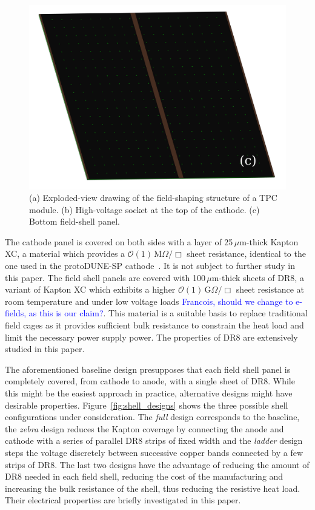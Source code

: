\documentclass[a4paper,12pt]{article}
\newcommand{\DR}{DR8}
\newcommand{\RI}[1]{\textcolor{blue}{#1}}
\begin{document}
\begin{figure}[htbp]
\begin{minipage}[b]{.4\textwidth}
	\includegraphics[width=\linewidth]{field_shell_bottom.PNG}
\end{minipage}
\caption{(a) Exploded-view drawing of the field-shaping structure of a TPC module. (b) High-voltage socket at the top of the cathode. (c) Bottom field-shell panel.}
\label{fig:field_shell}
\end{figure}

The cathode panel is covered on both sides with a layer of 25\,$\mu$m-thick Kapton XC, a material which provides a $\mathcal{O}(1)\,$M$\Omega/\Box$ sheet resistance, identical to the one used in the protoDUNE-SP cathode~\cite{protodune_sp_tdr}. It is not subject to further study in this paper. The field shell panels are covered with 100\,$\mu$m-thick sheets of {\DR}, a variant of Kapton XC which exhibits a higher $\mathcal{O}(1)\,$G$\Omega/\Box$ sheet resistance at room temperature and under low voltage loads \RI{ Francois, should we change to e-fields, as this is our claim?}. This material is a suitable basis to replace traditional field cages as it provides sufficient bulk resistance to constrain the heat load and limit the necessary power supply power. The properties of {\DR} are extensively studied in this paper.%

The aforementioned baseline design presupposes that each field shell panel is completely covered, from cathode to anode, with a single sheet of {\DR}. While this might be the easiest approach in practice, alternative designs might have desirable properties. Figure~\ref{fig:shell_designs} shows the three possible shell configurations under consideration. The \textit{full} design corresponds to the baseline, the \textit{zebra} design reduces the Kapton coverage by connecting the anode and cathode with a series of parallel {\DR} strips of fixed width and the \textit{ladder} design steps the voltage discretely between successive copper bands connected by a few strips of {\DR}. The last two designs have the advantage of reducing the amount of {\DR} needed in each field shell, reducing the cost of the manufacturing and increasing the bulk resistance of the shell, thus reducing the resistive heat load. Their electrical properties are briefly investigated in this paper.
\end{document}
